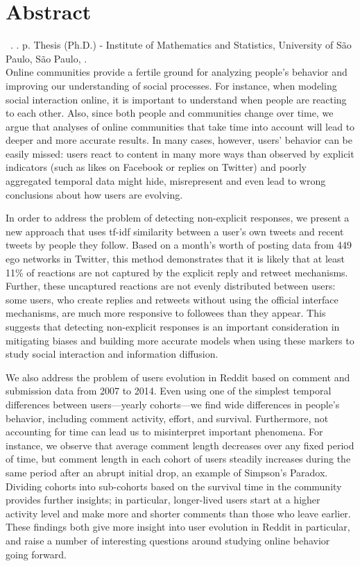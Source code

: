 \documentclass[11pt,twoside,a4paper]{book}
\begin{document}
\chapter*{Abstract}
\noindent \surnameAbbr~\textbf{\phdTitle}.
\thesisYear. \thesisPages p. Thesis (Ph.D.) - Institute of Mathematics and Statistics,
University of São Paulo, São Paulo, \thesisYear.
\\


Online communities provide a fertile ground for analyzing people's behavior and improving our understanding of social processes. For instance, when modeling social interaction online, it is important to understand when people are reacting to each other. Also, since both people and communities change over time, we argue that analyses of online communities that take time into account will lead to deeper and more accurate results. In many cases, however, users’ behavior can be easily missed: users react to content in many more ways than observed by explicit indicators (such as likes on Facebook or replies on Twitter) and poorly aggregated temporal data might hide, misrepresent and even lead to wrong conclusions about how users are evolving. 

In order to address the problem of detecting non-explicit responses, we present a new approach that uses tf-idf similarity between a user's own tweets and recent tweets by people they follow. Based on a month's worth of posting data from 449 ego networks in Twitter, this method demonstrates that it is likely that at least 11\% of reactions are not captured by the explicit reply and retweet mechanisms. Further, these uncaptured reactions are not evenly distributed between users: some users, who create replies and retweets without using the official interface mechanisms, are much more responsive to followees than they appear. This suggests that detecting non-explicit responses is an important consideration in mitigating biases and building more accurate models when using these markers to study social interaction and information diffusion. 

We also address the problem of users evolution in Reddit based on comment and submission data from 2007 to 2014. Even using one of the simplest temporal differences between users—yearly cohorts—we find wide differences in people's behavior, including comment activity, effort, and survival. Furthermore, not accounting for time can lead us to misinterpret important phenomena. For instance, we observe that average comment length decreases over any fixed period of time, but comment length in each cohort of users steadily increases during the same period after an abrupt initial drop, an example of Simpson's Paradox. Dividing cohorts into sub-cohorts based on the survival time in the community provides further insights; in particular, longer-lived users start at a higher activity level and make more and shorter comments than those who leave earlier. These findings both give more insight into user evolution in Reddit in particular, and raise a number of interesting questions around studying online behavior going forward.
\\
\end{document}
